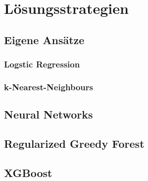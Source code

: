 \pagebreak
\section{Lösungsstrategien}\raggedbottom 
\subsection{Eigene Ansätze}
\subsubsection{Logstic Regression}
\subsubsection{k-Nearest-Neighbours}
\subsection{Neural Networks}
\subsection{Regularized Greedy Forest}
\subsection{XGBoost}